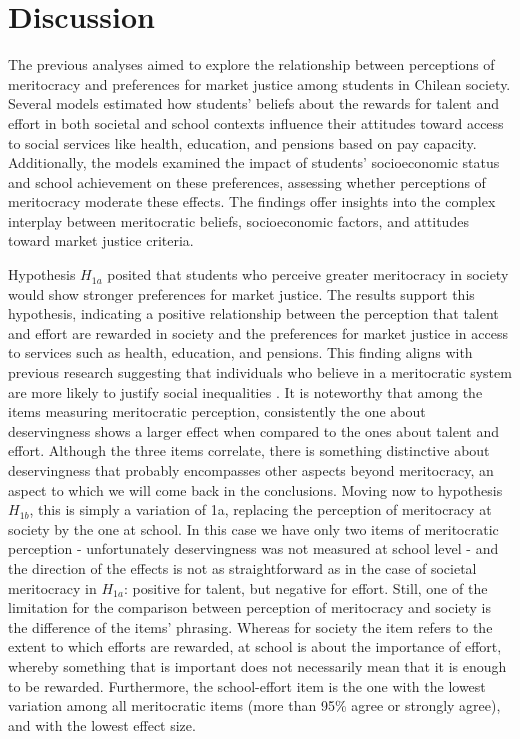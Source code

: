 \documentclass[
    behavsci,
    article,
    submit,
moreauthors
]{mdpi}
\begin{document}
\section{Discussion}\label{discussion}

The previous analyses aimed to explore the relationship between
perceptions of meritocracy and preferences for market justice among
students in Chilean society. Several models estimated how students'
beliefs about the rewards for talent and effort in both societal and
school contexts influence their attitudes toward access to social
services like health, education, and pensions based on pay capacity.
Additionally, the models examined the impact of students' socioeconomic
status and school achievement on these preferences, assessing whether
perceptions of meritocracy moderate these effects. The findings offer
insights into the complex interplay between meritocratic beliefs,
socioeconomic factors, and attitudes toward market justice criteria.

Hypothesis \(H_{1a}\) posited that students who perceive greater
meritocracy in society would show stronger preferences for market
justice. The results support this hypothesis, indicating a positive
relationship between the perception that talent and effort are rewarded
in society and the preferences for market justice in access to services
such as health, education, and pensions. This finding aligns with
previous research suggesting that individuals who believe in a
meritocratic system are more likely to justify social inequalities
\citep{batruch_belief_2022, wiederkehr_belief_2015}. It is noteworthy
that among the items measuring meritocratic perception, consistently the
one about deservingness shows a larger effect when compared to the ones
about talent and effort. Although the three items correlate, there is
something distinctive about deservingness that probably encompasses
other aspects beyond meritocracy, an aspect to which we will come back
in the conclusions. Moving now to hypothesis \(H_{1b}\), this is simply
a variation of 1a, replacing the perception of meritocracy at society by
the one at school. In this case we have only two items of meritocratic
perception - unfortunately deservingness was not measured at school
level - and the direction of the effects is not as straightforward as in
the case of societal meritocracy in \(H_{1a}\): positive for talent, but
negative for effort. Still, one of the limitation for the comparison
between perception of meritocracy and society is the difference of the
items' phrasing. Whereas for society the item refers to the extent to
which efforts are rewarded, at school is about the importance of effort,
whereby something that is important does not necessarily mean that it is
enough to be rewarded. Furthermore, the school-effort item is the one
with the lowest variation among all meritocratic items (more than 95\%
agree or strongly agree), and with the lowest effect size.
\end{document}
